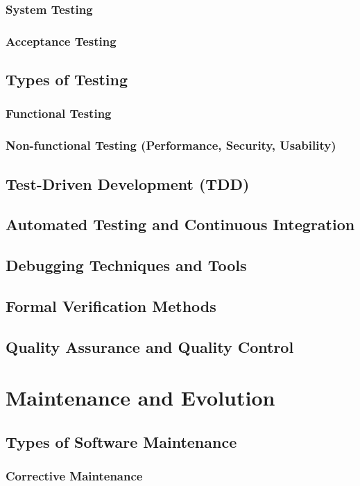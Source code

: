 \subsubsection{System Testing}
\subsubsection{Acceptance Testing}
\subsection{Types of Testing}
\subsubsection{Functional Testing}
\subsubsection{Non-functional Testing (Performance, Security, Usability)}
\subsection{Test-Driven Development (TDD)}
\subsection{Automated Testing and Continuous Integration}
\subsection{Debugging Techniques and Tools}
\subsection{Formal Verification Methods}
\subsection{Quality Assurance and Quality Control}

\newpage

\section{Maintenance and Evolution}
\subsection{Types of Software Maintenance}
\subsubsection{Corrective Maintenance}
